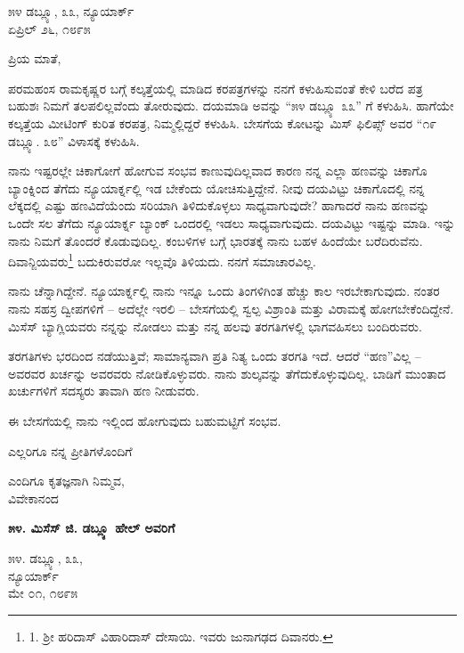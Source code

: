 \begin{flushright}
೫೪ ಡಬ್ಲ್ಯೂ, ೩೩, ನ್ಯೂಯಾರ್ಕ್\\ಏಪ್ರಿಲ್ ೨೬, ೧೮೯೫
\end{flushright}

ಪ್ರಿಯ ಮಾತೆ,

ಪರಮಹಂಸ ರಾಮಕೃಷ್ಣರ ಬಗ್ಗೆ ಕಲ್ಕತ್ತೆಯಲ್ಲಿ ಮಾಡಿದ ಕರಪತ್ರಗಳನ್ನು ನನಗೆ ಕಳುಹಿಸುವಂತೆ ಕೇಳಿ ಬರೆದ ಪತ್ರ ಬಹುಶಃ ನಿಮಗೆ ತಲಪಲಿಲ್ಲವೆಂದು ತೋರುವುದು. ದಯಮಾಡಿ ಅವನ್ನು “೫೪ ಡಬ್ಲ್ಯೂ ೩೩” ಗೆ ಕಳುಹಿಸಿ. ಹಾಗೆಯೇ ಕಲ್ಕತ್ತೆಯ ಮೀಟಿಂಗ್ ಕುರಿತ ಕರಪತ್ರ, ನಿಮ್ಮಲ್ಲಿದ್ದರೆ ಕಳುಹಿಸಿ. ಬೇಸಗೆಯ ಕೋಟನ್ನು ಮಿಸ್ ಫಿಲಿಪ್ಸ್ ಅವರ “೧೯ ಡಬ್ಲ್ಯೂ. ೩೮” ವಿಳಾಸಕ್ಕೆ ಕಳುಹಿಸಿ.

ನಾನು ಇಷ್ಟರಲ್ಲೇ ಚಿಕಾಗೋಗೆ ಹೋಗುವ ಸಂಭವ ಕಾಣುವುದಿಲ್ಲವಾದ ಕಾರಣ ನನ್ನ ಎಲ್ಲಾ ಹಣವನ್ನು ಚಿಕಾಗೊ ಬ್ಯಾಂಕ್ನಿಂದ ತೆಗೆದು ನ್ಯೂಯಾರ್ಕ್ನಲ್ಲಿ ಇಡ ಬೇಕೆಂದು ಯೋಚಿಸುತ್ತಿದ್ದೇನೆ. ನೀವು ದಯವಿಟ್ಟು ಚಿಕಾಗೊದಲ್ಲಿ ನನ್ನ ಲೆಕ್ಕದಲ್ಲಿ ಎಷ್ಟು ಹಣವಿದೆಯೆಂದು ಸರಿಯಾಗಿ ತಿಳಿದುಕೊಳ್ಳಲು ಸಾಧ್ಯವಾಗುವುದೇ? ಹಾಗಾದರೆ ನಾನು ಹಣವನ್ನು ಒಂದೇ ಸಲ ತೆಗೆದು ನ್ಯೂಯಾರ್ಕ್ನ ಬ್ಯಾಂಕ್ ಒಂದರಲ್ಲಿ ಇಡಲು ಸಾಧ್ಯವಾಗುವುದು. ದಯವಿಟ್ಟು ಇಷ್ಟನ್ನು ಮಾಡಿ. ಇನ್ನು ನಾನು ನಿಮಗೆ ತೊಂದರೆ ಕೊಡುವುದಿಲ್ಲ. ಕಂಬಳಿಗಳ ಬಗ್ಗೆ ಭಾರತಕ್ಕೆ ನಾನು ಬಹಳ ಹಿಂದೆಯೇ ಬರೆದಿರುವೆನು. ದಿವಾನ್ಜಿಯವರು\footnote{1. ಶ‍್ರೀ ಹರಿದಾಸ್ ವಿಹಾರಿದಾಸ್ ದೇಸಾಯಿ. ಇವರು ಜುನಾಗಢದ ದಿವಾನರು.} ಬದುಕಿರುವರೋ ಇಲ್ಲವೊ ತಿಳಿಯದು. ನನಗೆ ಸಮಾಚಾರವಿಲ್ಲ.

ನಾನು ಚೆನ್ನಾಗಿದ್ದೇನೆ. ನ್ಯೂಯಾರ್ಕ್ನಲ್ಲಿ ನಾನು ಇನ್ನೂ ಒಂದು ತಿಂಗಳಿಗಿಂತ ಹೆಚ್ಚು ಕಾಲ ಇರಬೇಕಾಗುವುದು. ನಂತರ ನಾನು ಸಹಸ್ರ ದ್ವೀಪಗಳಿಗೆ – ಅದೆಲ್ಲೇ ಇರಲಿ – ಬೇಸಗೆಯಲ್ಲಿ ಸ್ವಲ್ಪ ವಿಶ್ರಾಂತಿ ಮತ್ತು ವಿರಾಮಕ್ಕೆ ಹೋಗಬೇಕೆಂದಿದ್ದೇನೆ. ಮಿಸೆಸ್ ಬ್ಯಾಗ್ಲಿಯವರು ನನ್ನನ್ನು ನೋಡಲು ಮತ್ತು ನನ್ನ ಹಲವು ತರಗತಿಗಳಲ್ಲಿ ಭಾಗವಹಿಸಲು ಬಂದಿರುವರು.

ತರಗತಿಗಳು ಭರದಿಂದ ನಡೆಯುತ್ತಿವೆ; ಸಾಮಾನ್ಯವಾಗಿ ಪ್ರತಿ ನಿತ್ಯ ಒಂದು ತರಗತಿ ಇದೆ. ಆದರೆ “ಹಣ”ವಿಲ್ಲ – ಅವರವರ ಖರ್ಚನ್ನು ಅವರವರು ನೋಡಿಕೊಳ್ಳುವರು. ನಾನು ಶುಲ್ಕವನ್ನು ತೆಗೆದುಕೊಳ್ಳುವುದಿಲ್ಲ. ಬಾಡಿಗೆ ಮುಂತಾದ ಖರ್ಚುಗಳಿಗೆ ಸದಸ್ಯರು ತಾವಾಗಿ ಹಣ ನೀಡುವರು.

ಈ ಬೇಸಗೆಯಲ್ಲಿ ನಾನು ಇಲ್ಲಿಂದ ಹೋಗುವುದು ಬಹುಮಟ್ಟಿಗೆ ಸಂಭವ.

ಎಲ್ಲರಿಗೂ ನನ್ನ ಪ್ರೀತಿಗಳೊಂದಿಗೆ

\begin{flushright}
ಎಂದಿಗೂ ಕೃತಜ್ಞನಾಗಿ ನಿಮ್ಮವ,\\ವಿವೇಕಾನಂದ
\end{flushright}

\begin{center}
\textbf{೫೪. ಮಿಸೆಸ್ ಜಿ. ಡಬ್ಲ್ಯೂ ಹೇಲ್ ಅವರಿಗೆ}
\end{center}

\begin{flushright}
೫೪. ಡಬ್ಲ್ಯೂ, ೩೩,\\ನ್ಯೂಯಾರ್ಕ್\\ಮೇ ೦೧, ೧೮೯೫
\end{flushright}

